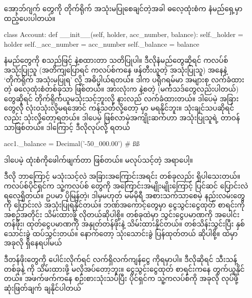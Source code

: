 အော့ဘ်ဂျက်  တွေကို တိုက်ရိုက် အသုံးမပြုစေချင်တဲ့အခါ  ဓလေ့ထုံးစံက  နံမည်ရှေ့မှာ \fCode{\_}  ထည့်ပေးပါတယ်။
%
\begin{py}
class Account:
    def __init__(self, holder, acc_number, balance):
        self._holder = holder
        self._acc_number = acc_number
        self._balance = balance
\end{py}
%
 နံမည်တွေကို \fEn{,}  စသည်ဖြင့်  \fCode{\_} နဲ့စထားတာ သတိပြုပါ။ ဒီလိုနံမည်တွေဆိုရင် ကလပ်စ်အသုံးပြုသူ (အတိကျပြောရင် ကလပ်စ်ကနေ ဖန်တီးယူတဲ့  အသုံးပြုသူ) အနေနဲ့ ‘တိုက်ရိုက် အသုံးမပြုရ’ လို့ အဓိပ္ပါယ်ရတယ်။ ဒါက  ပရိုဂရမ်မာ အများစု လက်ခံထားတဲ့ ဓလေ့ထုံးစံတစ်ခုသာ ဖြစ်တယ်။ အားလုံးက \fCode{\_} နဲ့စတဲ့  (မက်သဒ်တွေလည်းပါတယ်) တွေဆိုရင် တိုက်ရိုက်ယူမသုံးသင့်ဘူးလို့ နားလည် လက်ခံထားတယ်။ ဒါပေမဲ့ အခြား  တွေလို လုံးဝသုံးလို့မရအောင် ကန့်သတ်လို့တော့  မှာ မရနိုင်ဘူး။ သုံးချင်သပဆိုရင်လည်း သုံးလို့တော့ရတယ်။ ဒါပေမဲ့ ဖြစ်လာမဲ့အကျိုးဆက်ဟာ အသုံးပြုသူရဲ့ တာဝန်သာဖြစ်တယ်။ ဒါကြောင့် ဒီလိုလုပ်လို့ ရတယ်
%
\begin{py}
acc1._balance = Decimal('-50_000.00')    # ßß
\end{py}
%
ဒါပေမဲ့ ထုံးစံကိုဖေါက်ဖျက်တာ ဖြစ်တယ်။ မလုပ်သင့်တဲ့ အရာပေါ့။ 

ဒီလို ဘာကြောင့် မသုံးသင့်လဲ အခြားအကြောင်းအရင်း တစ်ခုလည်း ရှိပါသေးတယ်။ ကလပ်စ်ပိုင်ရှင်က သူ့ကလပ်စ်  တွေကို အကြောင်းအမျိုးမျိုးကြောင့် ပြင်ဆင် ပြောင်းလဲရလေ့ရှိတယ်။ ဥပမာ ပိုမြန်တဲ့၊ ဒါမှမဟုတ် မမ်မိုရီ အစားသက်သာစေမဲ့ နည်းလမ်းတွေကို ပြောင်းလဲ အသုံးပြုရနိုင်တယ်။ ဘဏ်အကောင့်တွေမှာ ငွေသွင်းငွေထုတ် စာရင်းကို အစဉ်အတိုင်း သိမ်းထားဖို့ လိုတယ်ဆိုပါစို့။  တစ်ခုထဲမှာ သွင်းငွေပမာဏကို အပေါင်းတန်ဖိုး၊ ထုတ်ငွေပမာဏကို အနှုတ်တန်ဖိုးနဲ့ သိမ်းထားနိုင်တယ်။ တစ်သိန်းသွင်းပြီး နှစ်သောင်းခွဲ ထပ်သွင်းတယ်။ နောက်တော့ သုံးသောင်းခွဲ ပြန်ထုတ်တယ် ဆိုပါစို့။  ထဲမှာ အခုလို ရှိနေရပါမယ်
%
\begin{py}
[100000.00, 25000.00, -35000.00]
\end{py}
%
ဒီတန်ဖိုးတွေကို ပေါင်းလိုက်ရင် လက်ရှိလက်ကျန်ငွေ  ကိုရမှာပါ။ ဒီလိုဆိုရင် သီးသန့်   တစ်ခုနဲ့  ကို သိမ်းထားဖို့ မလိုအပ်တော့ဘူး။ ငွေသွင်းငွေထုတ် စာရင်းကနေ  တွက်ယူနိုင်တယ်။ အဖက်ဖက်ကနေ စဉ်းစားသုံးသပ်ပြီး ပိုင်ရှင်က သူ့ကလပ်စ်ကို အခုလို  လုပ်ဖို့ ဆုံးဖြတ်ချက် ချနိုင်ပါတယ်


